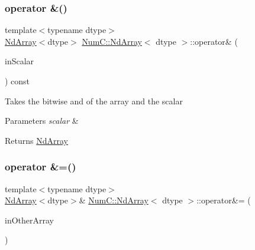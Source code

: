 \subsubsection{\texorpdfstring{operator \&()}{operator \&()}\hspace{0.1cm}{\footnotesize\ttfamily [2/2]}}
{\footnotesize\ttfamily template$<$typename dtype$>$ \\
\mbox{\hyperlink{class_num_c_1_1_nd_array}{Nd\+Array}}$<$dtype$>$ \mbox{\hyperlink{class_num_c_1_1_nd_array}{Num\+C\+::\+Nd\+Array}}$<$ dtype $>$\+::operator\& (\begin{DoxyParamCaption}\item[{dtype}]{in\+Scalar }\end{DoxyParamCaption}) const\hspace{0.3cm}{\ttfamily [inline]}}

Takes the bitwise and of the array and the scalar


\begin{DoxyParams}{Parameters}
{\em scalar} & \\
\hline
\end{DoxyParams}
\begin{DoxyReturn}{Returns}
\mbox{\hyperlink{class_num_c_1_1_nd_array}{Nd\+Array}} 
\end{DoxyReturn}
\mbox{\label{class_num_c_1_1_nd_array_ab80433168fc9b6c44e49f68688826802}} 
\subsubsection{\texorpdfstring{operator \&=()}{operator \&=()}\hspace{0.1cm}{\footnotesize\ttfamily [1/2]}}
{\footnotesize\ttfamily template$<$typename dtype$>$ \\
\mbox{\hyperlink{class_num_c_1_1_nd_array}{Nd\+Array}}$<$dtype$>$\& \mbox{\hyperlink{class_num_c_1_1_nd_array}{Num\+C\+::\+Nd\+Array}}$<$ dtype $>$\+::operator\&= (\begin{DoxyParamCaption}\item[{const \mbox{\hyperlink{class_num_c_1_1_nd_array}{Nd\+Array}}$<$ dtype $>$ \&}]{in\+Other\+Array }\end{DoxyParamCaption})\hspace{0.3cm}{\ttfamily [inline]}}

